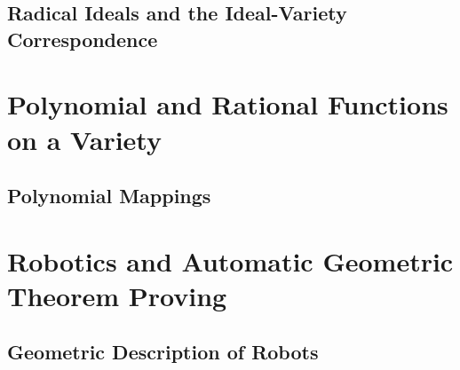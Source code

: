 \documentclass[twoside]{amsart}
\theoremstyle{plain}
\theoremstyle{definition}
\begin{document}
\subsection{Radical Ideals and the Ideal-Variety Correspondence}



\section{Polynomial and Rational Functions on a Variety}


\subsection{Polynomial Mappings }


\section{Robotics and Automatic Geometric Theorem Proving}



\subsection{Geometric Description of Robots }
\end{document}
